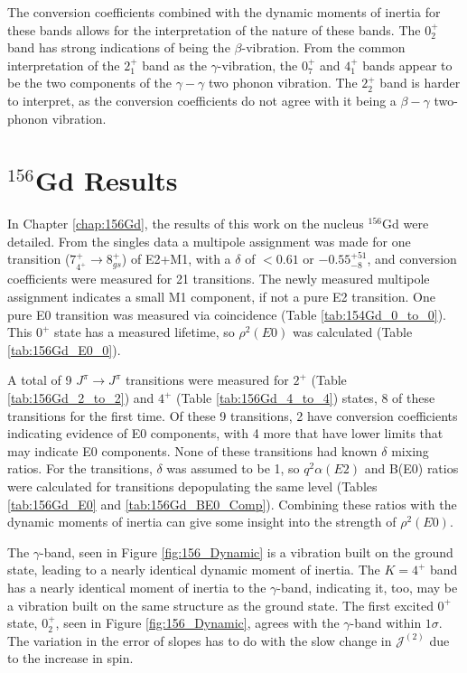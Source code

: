 The conversion coefficients combined with the dynamic moments of inertia for these bands allows for the interpretation of the nature of these bands. The $0^+_2$ band has strong indications of being the $\beta$-vibration. From the common interpretation of the $2^+_1$ band as the $\gamma$-vibration, the $0^+_7$ and $4^+_1$ bands appear to be the two components of the $\gamma-\gamma$ two phonon vibration. The $2^+_2$ band is harder to interpret, as the conversion coefficients do not agree with it being a $\beta-\gamma$ two-phonon vibration.



\section{$^{156}$Gd Results}
\label{sec:156_Dynamic}

In Chapter \ref{chap:156Gd}, the results of this work on the nucleus $^{156}$Gd were detailed. From the singles data a multipole assignment was made for one transition ($7^+_{4^+}\rightarrow 8^+_{gs}$) of E2+M1, with a $\delta$ of $<0.61$ or $-0.55^{+51}_{-8}$, and conversion coefficients were measured for 21 transitions. The newly measured multipole assignment indicates a small M1 component, if not a pure E2 transition. One pure E0 transition was measured via coincidence (Table \ref{tab:154Gd_0_to_0}). This $0^+$ state has a measured lifetime, so $\rho^2(E0)$ was calculated (Table \ref{tab:156Gd_E0_0}).

A total of 9 $J^{\pi}\rightarrow J^{\pi}$ transitions were measured for $2^+$ (Table \ref{tab:156Gd_2_to_2}) and $4^+$ (Table \ref{tab:156Gd_4_to_4}) states, 8 of these transitions for the first time. Of these 9 transitions, 2 have conversion coefficients indicating evidence of E0 components, with 4 more that have lower limits that may indicate E0 components. None of these transitions had known $\delta$ mixing ratios. For the transitions, $\delta$ was assumed to be 1, so $q^2\alpha(E2)$ and B(E0) ratios were calculated for transitions depopulating the same level (Tables \ref{tab:156Gd_E0} and \ref{tab:156Gd_BE0_Comp}). Combining these ratios with the dynamic moments of inertia can give some insight into the strength of $\rho^2(E0)$.



%



The $\gamma$-band, seen in Figure \ref{fig:156_Dynamic} is a vibration built on the ground state, leading to a nearly identical dynamic moment of inertia. The $K=4^+$ band has a nearly identical moment of inertia to the $\gamma$-band, indicating it, too, may be a vibration built on the same structure as the ground state. The first excited $0^+$ state, $0^+_2$, seen in Figure \ref{fig:156_Dynamic}, agrees with the $\gamma$-band within $1\sigma$. The variation in the error of slopes has to do with the slow change in $\mathcal{J}^{(2)}$ due to the increase in spin. 

